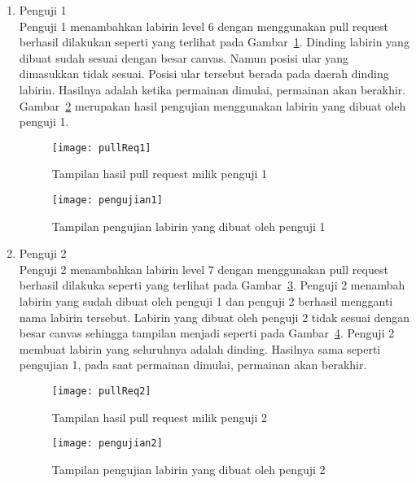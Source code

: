 \begin{enumerate}
	\item Penguji 1\\
	Penguji 1 menambahkan labirin level 6 dengan menggunakan pull request berhasil dilakukan seperti yang terlihat pada Gambar~\ref{fig:pullReq1}. Dinding labirin yang dibuat sudah sesuai dengan besar canvas. Namun posisi ular yang dimasukkan tidak sesuai. Posisi ular tersebut berada pada daerah dinding labirin. Hasilnya adalah ketika permainan dimulai, permainan akan berakhir. Gambar~\ref{fig:pengujian1} merupakan hasil pengujian menggunakan labirin yang dibuat oleh penguji 1.
	
	\begin{figure}[H]
		\centering  
		\texttt{[image: pullReq1]}  
		\caption[Tampilan hasil pull request milik penguji 1]{Tampilan hasil pull request milik penguji 1}
		\label{fig:pullReq1} 
	\end{figure}
	
	\begin{figure}[H]
		\centering  
		\texttt{[image: pengujian1]}  
		\caption[Tampilan pengujian labirin yang dibuat oleh penguji 1]{Tampilan pengujian labirin yang dibuat oleh penguji 1}
		\label{fig:pengujian1} 
	\end{figure}	
	
	\item Penguji 2\\
	Penguji 2 menambahkan labirin level 7 dengan menggunakan pull request berhasil dilakuka seperti yang terlihat pada Gambar~\ref{fig:pullReq2}. Penguji 2 menambah labirin yang sudah dibuat oleh penguji 1 dan penguji 2 berhasil mengganti nama labirin tersebut. Labirin yang dibuat oleh penguji 2 tidak sesuai dengan besar canvas sehingga tampilan menjadi seperti pada Gambar~\ref{fig:pengujian2}. Penguji 2 membuat labirin yang seluruhnya adalah dinding. Hasilnya sama seperti pengujian 1, pada saat permainan dimulai, permainan akan berakhir.
	
	\begin{figure}[H]
		\centering  
		\texttt{[image: pullReq2]}  
		\caption[Tampilan hasil pull request milik penguji 2]{Tampilan hasil pull request milik penguji 2}
		\label{fig:pullReq2} 
	\end{figure}
	
	\begin{figure}[H]
		\centering  
		\texttt{[image: pengujian2]}  
		\caption[Tampilan pengujian labirin yang dibuat oleh penguji 2]{Tampilan pengujian labirin yang dibuat oleh penguji 2}
		\label{fig:pengujian2} 
	\end{figure}
	
\end{enumerate}